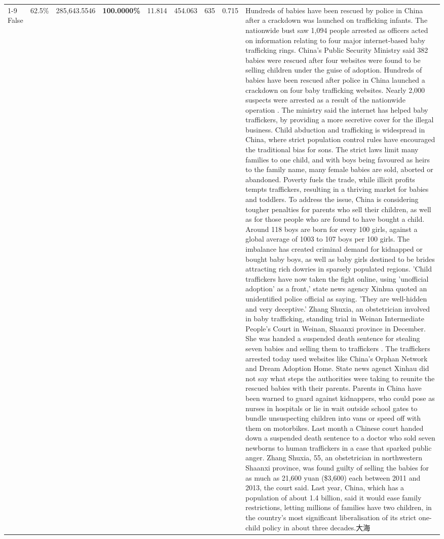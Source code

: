 \begin{table}[H]
\begin{tabular}{lllrlllll}
\cline{1-9}
False & 62.5\% & \color{red} 285,643.5546 & \bfseries \color{red} 100.0000\% & 11.814 & 454.063 & 635 & 0.715 & Hundreds of babies have been rescued by police in China after a crackdown was launched on trafficking infants. The nationwide bust saw 1,094 people arrested as officers acted on information relating to four major internet-based baby trafficking rings. China's Public Security Ministry said 382 babies were rescued after four websites were found to be selling children under the guise of adoption. Hundreds of babies have been rescued after police in China launched a crackdown on four baby trafficking websites. Nearly 2,000 suspects were arrested as a result of the nationwide operation . The ministry said the internet has helped baby traffickers, by providing a more secretive cover for the illegal business. Child abduction and trafficking is widespread in China, where strict population control rules have encouraged the traditional bias for sons. The strict laws limit many families to one child, and with boys being favoured as heirs to the family name, many female babies are sold, aborted or abandoned. Poverty fuels the trade, while illicit profits tempts traffickers, resulting in a thriving market for babies and toddlers. To address the issue, China is considering tougher penalties for parents who sell their children, as well as for those people who are found to have bought a child. Around 118 boys are born for every 100 girls, against a global average of 1003 to 107 boys per 100 girls. The imbalance has created criminal demand for kidnapped or bought baby boys, as well as baby girls destined to be brides attracting rich dowries in sparsely populated regions. 'Child traffickers have now taken the fight online, using 'unofficial adoption' as a front,' state news agency Xinhua quoted an unidentified police official as saying. 'They are well-hidden and very deceptive.' Zhang Shuxia, an obstetrician involved in baby trafficking, standing trial in Weinan Intermediate People's Court in Weinan, Shaanxi province in December. She was handed a suspended death sentence for stealing seven babies and selling them to traffickers . The traffickers arrested today used websites like China's Orphan Network and Dream Adoption Home. State news agenct Xinhau did not say what steps the authorities were taking to reunite the rescued babies with their parents. Parents in China have been warned to guard against kidnappers, who could pose as nurses in hospitals or lie in wait outside school gates to bundle unsuspecting children into vans or speed off with them on motorbikes. Last month a Chinese court handed down a suspended death sentence to a doctor who sold seven newborns to human traffickers in a case that sparked public anger. Zhang Shuxia, 55, an obstetrician in northwestern Shaanxi province, was found guilty of selling the babies for as much as 21,600 yuan (\$3,600) each between 2011 and 2013, the court said. Last year, China, which has a population of about 1.4 billion, said it would ease family restrictions, letting millions of families have two children, in the country's most significant liberalisation of its strict one-child policy in about three decades.大海 \\

\end{tabular}
\end{table}
